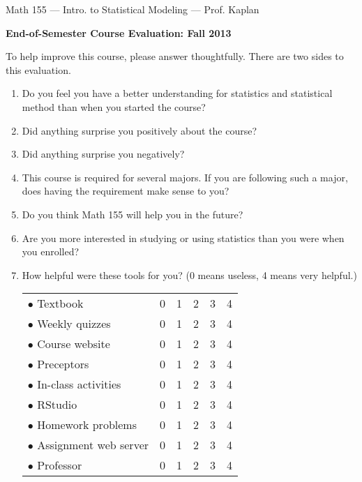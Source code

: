 \documentclass{article}
\newcommand{\answerSpace}{\vspace*{1.5cm}}
\begin{document}
\begin{centering}
{\Large \sffamily Math 155 --- Intro. to Statistical Modeling --- Prof. Kaplan}\\
\bigskip

{\Large \sffamily \bfseries{End-of-Semester Course Evaluation: Fall 2013}}\\
\bigskip
\end{centering}

\bigskip

To help improve this course, please answer thoughtfully.  There are two sides to this evaluation.

\begin{enumerate}

\item Do you feel you have a better understanding for statistics and statistical method than when you started the course?

\answerSpace

\item Did anything surprise you positively about the course?

\answerSpace

\item Did anything surprise you negatively?

\answerSpace

\item This course is required for several majors.  If you are following such a major, does having the requirement make sense to you?

\answerSpace

\item Do you think Math 155 will help you in the future?

\answerSpace

\item Are you more interested in studying or using statistics than you were when you enrolled?

\answerSpace

\item How helpful were these tools for you?  (0 means useless, 4 means very helpful.)

\begin{tabular}{lrrrrr}
$\bullet$ Textbook & 0 & 1 & 2 & 3 & 4\\
$\bullet$ Weekly quizzes & 0 & 1 & 2 & 3 & 4\\
$\bullet$ Course website         & 0 & 1 & 2 & 3 & 4\\
$\bullet$ Preceptors         & 0 & 1 & 2 & 3 & 4\\
$\bullet$ In-class activities         & 0 & 1 & 2 & 3 & 4\\
$\bullet$ RStudio & 0 & 1 & 2 & 3 & 4\\
$\bullet$ Homework problems & 0 & 1 & 2 & 3 & 4\\
$\bullet$ Assignment web server & 0 & 1 & 2 & 3 & 4\\
$\bullet$ Professor         & 0 & 1 & 2 & 3 & 4\\
\end{tabular}


\end{enumerate}
\end{document}
